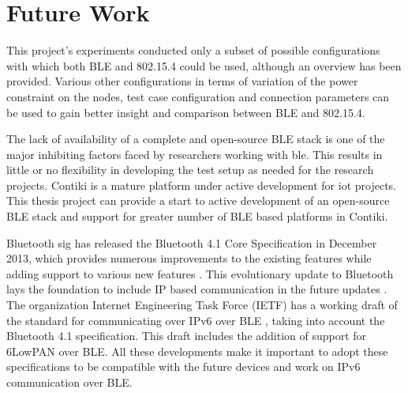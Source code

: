%

\section{Future Work}

This project's experiments conducted only a subset of possible configurations with which both BLE and 802.15.4 could be used, although an overview has been provided. Various other configurations in terms of variation of the power constraint on the nodes, test case configuration and connection parameters can be used to gain better insight and comparison between BLE and 802.15.4.

The lack of availability of a complete and open-source BLE stack is one of the major inhibiting factors faced by researchers working with \gls{ble}. This results in little or no flexibility in developing the test setup as needed for the research projects. Contiki is a mature platform under active development for \gls{iot} projects. This thesis project can provide a start to active development of an open-source BLE stack and support for greater number of BLE based platforms in Contiki.

Bluetooth \gls{sig} has released the Bluetooth 4.1 Core Specification in December 2013, which provides numerous improvements to the existing features while adding support to various new features \cite{4.1ExtendsIoT}. This evolutionary update to Bluetooth lays the foundation to include IP based communication in the future updates \cite{4.0to4.1}. The organization Internet Engineering Task Force (IETF) has a working draft of the standard for communicating over IPv6 over BLE \cite{ieftIPv6Draft}, taking into account the Bluetooth 4.1 specification. This draft includes the addition of support for 6LowPAN over BLE. All these developments make it important to adopt these specifications to be compatible with the future devices and work on IPv6 communication over BLE. 

